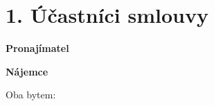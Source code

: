 \section*{1. Účastníci smlouvy}

\textbf{Pronajímatel}\\
\ContractLandlordsCZ

\vspace{0.5cm}

\textbf{Nájemce}\\
\ContractTenantsCZ

Oba bytem: \Propaddress
